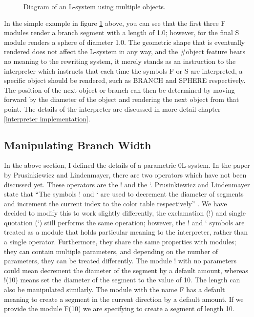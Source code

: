 \begin{figure}[htbp]
	{\centering
		\vspace{7px}
		\setlength{\fboxrule}{1pt}
		\caption{Diagram of an L-system using multiple objects.} \label{object statement example}
	}
\end{figure}
\FloatBarrier

\noindent
In the simple example in figure \ref{object statement example} above, you can see that the first three F modules render a branch segment with a length of 1.0; however, for the final S module renders a sphere of diameter 1.0. The geometric shape that is eventually rendered does not affect the L-system in any way, and the \#object feature bears no meaning to the rewriting system, it merely stands as an instruction to the interpreter which instructs that each time the symbols F or S are interpreted, a specific object should be rendered, such as BRANCH and SPHERE respectively. The position of the next object or branch can then be determined by moving forward by the diameter of the object and rendering the next object from that point. The details of the interpreter are discussed in more detail chapter \ref{interpreter implementation}.

\subsection{Manipulating Branch Width}

In the above section, I defined the details of a parametric 0L-system. In the paper by Prusinkiewicz and Lindenmayer, there are two operators which have not been discussed yet. These operators are the ! and the ‘. Prusinkiewicz and Lindenmayer state that “The symbols ! and ‘ are used to decrement the diameter of segments and increment the current index to the color table respectively” \cite{prusinkiewicz2012algorithmic}. We have decided to modify this to work slightly differently, the exclamation (!) and single quotation (‘) still performs the same operation; however, the ! and ‘ symbols are treated as a module that holds particular meaning to the interpreter, rather than a single operator. Furthermore, they share the same properties with modules; they can contain multiple parameters, and depending on the number of parameters, they can be treated differently. The module ! with no parameters could mean decrement the diameter of the segment by a default amount, whereas !(10) means set the diameter of the segment to the value of 10. The length can also be manipulated similarly. The module with the name F has a default meaning to create a segment in the current direction by a default amount. If we provide the module F(10) we are specifying to create a segment of length 10.

